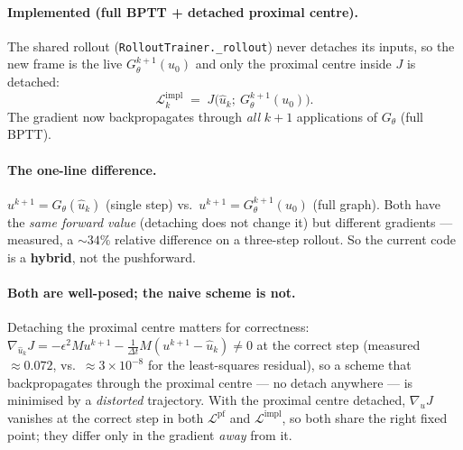 \documentclass[11pt]{article}
\newcommand{\dt}{\Delta t}
\newcommand{\uhat}{\hat u}
\begin{document}
\paragraph{Implemented (full BPTT + detached proximal centre).} The shared rollout
(\texttt{RolloutTrainer.\_rollout}) never detaches its inputs, so the new frame is the live
$G^{k+1}_\theta(u_0)$ and only the proximal centre inside $J$ is detached:
\begin{equation}
  \mathcal L^{\mathrm{impl}}_k \;=\; J\big(\uhat_k;\ G^{k+1}_\theta(u_0)\big).
\end{equation}
The gradient now backpropagates through \emph{all} $k+1$ applications of $G_\theta$ (full BPTT).

\paragraph{The one-line difference.} $u^{k+1}=G_\theta(\uhat_k)$ (single step) vs.\
$u^{k+1}=G^{k+1}_\theta(u_0)$ (full graph). Both have the \emph{same forward value} (detaching does
not change it) but different gradients --- measured, a $\sim\!34\%$ relative difference on a
three-step rollout. So the current code is a \textbf{hybrid}, not the pushforward.

\paragraph{Both are well-posed; the naive scheme is not.} Detaching the proximal centre matters for
correctness: $\nabla_{\uhat_k}J=-\epsilon^2 Mu^{k+1}-\tfrac1{\dt}M(u^{k+1}-\uhat_k)\neq 0$ at the
correct step (measured $\approx 0.072$, vs.\ $\approx 3\times10^{-8}$ for the least-squares
residual), so a scheme that backpropagates through the proximal centre --- no detach anywhere ---
is minimised by a \emph{distorted} trajectory. With the proximal centre detached, $\nabla_u J$
vanishes at the correct step in both $\mathcal L^{\mathrm{pf}}$ and $\mathcal L^{\mathrm{impl}}$, so
both share the right fixed point; they differ only in the gradient \emph{away} from it.
\end{document}
